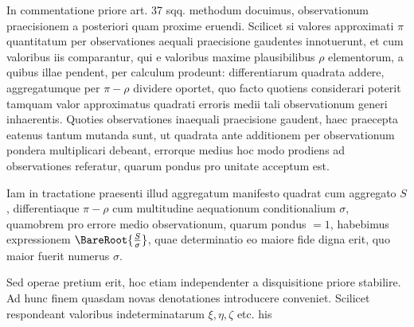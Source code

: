 In commentatione priore art. 37 sqq. methodum docuimus, observationum praecisionem a posteriori quam proxime eruendi. Scilicet si valores approximati \(\pi\) quantitatum per observationes aequali praecisione gaudentes innotuerunt, et cum valoribus iis comparantur, qui e valoribus maxime plausibilibus \(\rho\) elementorum, a quibus illae pendent, per calculum prodeunt: differentiarum quadrata addere, aggregatumque per \(\pi-\rho\) dividere oportet, quo facto quotiens considerari poterit tamquam valor approximatus quadrati erroris medii tali observationum generi inhaerentis. Quoties observationes inaequali praecisione gaudent, haec praecepta eatenus tantum mutanda sunt, ut quadrata ante additionem per observationum pondera multiplicari debeant, errorque medius hoc modo prodiens ad observationes referatur, quarum pondus pro unitate acceptum est.

Iam in tractatione praesenti illud aggregatum manifesto quadrat cum aggregato \(S\), differentiaque \(\pi-\rho\) cum multitudine aequationum conditionalium \(\sigma\), quamobrem pro errore medio observationum, quarum pondus \(=1\), habebimus expressionem \(\BareRoot{\frac S\sigma}\), quae determinatio eo maiore fide digna erit, quo maior fuerit numerus \(\sigma\).

Sed operae pretium erit, hoc etiam independenter a disquisitione priore stabilire. Ad hunc finem quasdam novas denotationes introducere conveniet. Scilicet respondeant valoribus indeterminatarum \(\xi,\eta,\zeta\) etc. his
